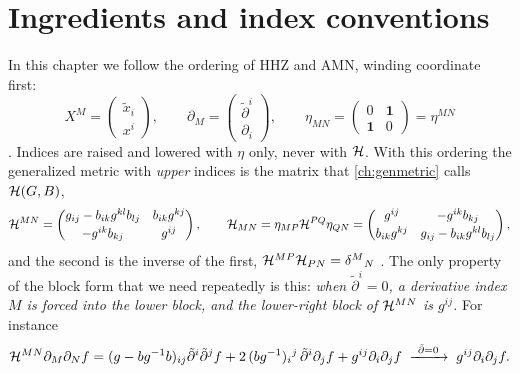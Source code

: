 \section{Ingredients and index conventions}\label{sec:dftaction:ingredients}

In this chapter we follow the ordering of HHZ and AMN, winding coordinate first:
\begin{equation}\label{eq:dftaction:XM}
X^M=\begin{pmatrix}\tilde x_i\\ x^i\end{pmatrix},\qquad
\partial_M=\begin{pmatrix}\tilde\partial^i\\ \partial_i\end{pmatrix},\qquad
\eta_{MN}=\begin{pmatrix}0&\mathbf 1\\ \mathbf 1&0\end{pmatrix}=\eta^{MN}
\end{equation}
. Indices are raised and lowered with $\eta$
only, never with $\mathcal{H}$. With this ordering the generalized metric with \emph{upper} indices is
the matrix that \cref{ch:genmetric} calls $\mathcal{H}(G,B)$,
\begin{equation}\label{eq:dftaction:Hup}
\mathcal{H}^{MN}=\begin{pmatrix}g_{ij}-b_{ik}g^{kl}b_{lj}&b_{ik}g^{kj}\\[2pt]
-g^{ik}b_{kj}&g^{ij}\end{pmatrix},\qquad
\mathcal{H}_{MN}=\eta_{MP}\mathcal{H}^{PQ}\eta_{QN}=\begin{pmatrix}g^{ij}&-g^{ik}b_{kj}\\[2pt]
b_{ik}g^{kj}&g_{ij}-b_{ik}g^{kl}b_{lj}\end{pmatrix},
\end{equation}
and the second is the inverse of the first, $\mathcal{H}^{MP}\mathcal{H}_{PN}=\delta^M{}_N$
. The only property of the block form that we
need repeatedly is this: \emph{when $\tilde\partial^i=0$, a derivative index $M$ is forced into
the lower block, and the lower-right block of $\mathcal{H}^{MN}$ is $g^{ij}$.} For instance
\begin{equation}\label{eq:dftaction:box}
\mathcal{H}^{MN}\partial_M\partial_N f=(g-bg^{-1}b)_{ij}\tilde\partial^i\tilde\partial^jf
+2\,(bg^{-1})_i{}^{j}\,\tilde\partial^i\partial_jf+g^{ij}\partial_i\partial_jf
\;\xrightarrow{\ \tilde\partial=0\ }\;g^{ij}\partial_i\partial_jf .
\end{equation}
